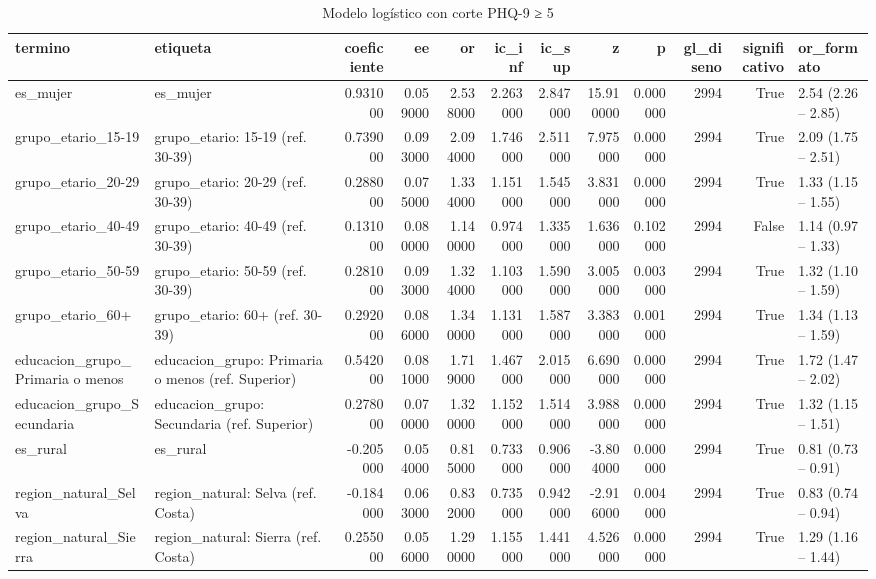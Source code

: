 \begin{table}[htbp]
\caption{Modelo logístico con corte PHQ-9 ≥ 5}
\label{tab:tabla_26_sensibilidad_corte5}
\begin{tabular}{llrrrrrrrrrl}
\toprule
termino & etiqueta & coeficiente & ee & or & ic\_inf & ic\_sup & z & p & gl\_diseno & significativo & or\_formato \\
\midrule
es\_mujer & es\_mujer & 0.931000 & 0.059000 & 2.538000 & 2.263000 & 2.847000 & 15.910000 & 0.000000 & 2994 & True & 2.54 (2.26 – 2.85) \\
grupo\_etario\_15-19 & grupo\_etario: 15-19 (ref. 30-39) & 0.739000 & 0.093000 & 2.094000 & 1.746000 & 2.511000 & 7.975000 & 0.000000 & 2994 & True & 2.09 (1.75 – 2.51) \\
grupo\_etario\_20-29 & grupo\_etario: 20-29 (ref. 30-39) & 0.288000 & 0.075000 & 1.334000 & 1.151000 & 1.545000 & 3.831000 & 0.000000 & 2994 & True & 1.33 (1.15 – 1.55) \\
grupo\_etario\_40-49 & grupo\_etario: 40-49 (ref. 30-39) & 0.131000 & 0.080000 & 1.140000 & 0.974000 & 1.335000 & 1.636000 & 0.102000 & 2994 & False & 1.14 (0.97 – 1.33) \\
grupo\_etario\_50-59 & grupo\_etario: 50-59 (ref. 30-39) & 0.281000 & 0.093000 & 1.324000 & 1.103000 & 1.590000 & 3.005000 & 0.003000 & 2994 & True & 1.32 (1.10 – 1.59) \\
grupo\_etario\_60+ & grupo\_etario: 60+ (ref. 30-39) & 0.292000 & 0.086000 & 1.340000 & 1.131000 & 1.587000 & 3.383000 & 0.001000 & 2994 & True & 1.34 (1.13 – 1.59) \\
educacion\_grupo\_Primaria o menos & educacion\_grupo: Primaria o menos (ref. Superior) & 0.542000 & 0.081000 & 1.719000 & 1.467000 & 2.015000 & 6.690000 & 0.000000 & 2994 & True & 1.72 (1.47 – 2.02) \\
educacion\_grupo\_Secundaria & educacion\_grupo: Secundaria (ref. Superior) & 0.278000 & 0.070000 & 1.320000 & 1.152000 & 1.514000 & 3.988000 & 0.000000 & 2994 & True & 1.32 (1.15 – 1.51) \\
es\_rural & es\_rural & -0.205000 & 0.054000 & 0.815000 & 0.733000 & 0.906000 & -3.804000 & 0.000000 & 2994 & True & 0.81 (0.73 – 0.91) \\
region\_natural\_Selva & region\_natural: Selva (ref. Costa) & -0.184000 & 0.063000 & 0.832000 & 0.735000 & 0.942000 & -2.916000 & 0.004000 & 2994 & True & 0.83 (0.74 – 0.94) \\
region\_natural\_Sierra & region\_natural: Sierra (ref. Costa) & 0.255000 & 0.056000 & 1.290000 & 1.155000 & 1.441000 & 4.526000 & 0.000000 & 2994 & True & 1.29 (1.16 – 1.44) \\

\end{tabular}
\end{table}
